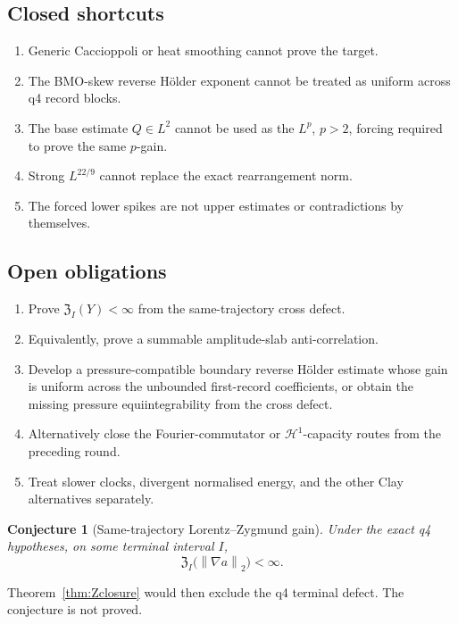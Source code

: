 \documentclass[11pt]{article}
\newtheorem{conjecture}[theorem]{Conjecture}
\theoremstyle{remark}
\newcommand{\norm}[1]{\left\|#1\right\|}
\newcommand{\cZ}{\mathfrak Z}
\begin{document}
\subsection*{Closed shortcuts}

\begin{enumerate}
\item Generic Caccioppoli or heat smoothing cannot prove the target.
\item The BMO-skew reverse H\"older exponent cannot be treated as
uniform across q4 record blocks.
\item The base estimate \(Q\in L^2\) cannot be used as the \(L^p\),
\(p>2\), forcing required to prove the same \(p\)-gain.
\item Strong \(L^{22/9}\) cannot replace the exact rearrangement norm.
\item The forced lower spikes are not upper estimates or contradictions
by themselves.
\end{enumerate}

\subsection*{Open obligations}

\begin{enumerate}
\item Prove \(\cZ_I(Y)<\infty\) from the same-trajectory cross defect.
\item Equivalently, prove a summable amplitude-slab anti-correlation.
\item Develop a pressure-compatible boundary reverse H\"older estimate
whose gain is uniform across the unbounded first-record coefficients,
or obtain the missing pressure equiintegrability from the cross defect.
\item Alternatively close the Fourier-commutator or
\(\mathcal H^1\)-capacity routes from the preceding round.
\item Treat slower clocks, divergent normalised energy, and the other
Clay alternatives separately.
\end{enumerate}

\begin{conjecture}[Same-trajectory Lorentz--Zygmund gain]
Under the exact q4 hypotheses, on some terminal interval \(I\),
\[
 \cZ_I\bigl(\norm{\nabla a}_2\bigr)<\infty.
\]
\end{conjecture}

Theorem~\ref{thm:Zclosure} would then exclude the q4 terminal defect.
The conjecture is not proved.
\end{document}
